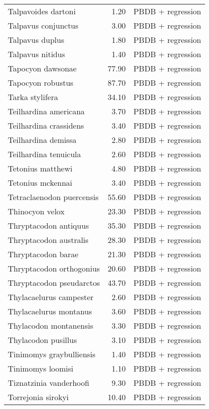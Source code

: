 \begin{table}[ht]
\begin{tabular}{lrl}
  Talpavoides dartoni & 1.20 & PBDB + regression \\ 
  Talpavus conjunctus & 3.00 & PBDB + regression \\ 
  Talpavus duplus & 1.80 & PBDB + regression \\ 
  Talpavus nitidus & 1.40 & PBDB + regression \\ 
  Tapocyon dawsonae & 77.90 & PBDB + regression \\ 
  Tapocyon robustus & 87.70 & PBDB + regression \\ 
  Tarka stylifera & 34.10 & PBDB + regression \\ 
  Teilhardina americana & 3.70 & PBDB + regression \\ 
  Teilhardina crassidens & 3.40 & PBDB + regression \\ 
  Teilhardina demissa & 2.80 & PBDB + regression \\ 
  Teilhardina tenuicula & 2.60 & PBDB + regression \\ 
  Tetonius matthewi & 4.80 & PBDB + regression \\ 
  Tetonius mckennai & 3.40 & PBDB + regression \\ 
  Tetraclaenodon puercensis & 55.60 & PBDB + regression \\ 
  Thinocyon velox & 23.30 & PBDB + regression \\ 
  Thryptacodon antiquus & 35.30 & PBDB + regression \\ 
  Thryptacodon australis & 28.30 & PBDB + regression \\ 
  Thryptacodon barae & 21.30 & PBDB + regression \\ 
  Thryptacodon orthogonius & 20.60 & PBDB + regression \\ 
  Thryptacodon pseudarctos & 43.70 & PBDB + regression \\ 
  Thylacaelurus campester & 2.60 & PBDB + regression \\ 
  Thylacaelurus montanus & 3.60 & PBDB + regression \\ 
  Thylacodon montanensis & 3.30 & PBDB + regression \\ 
  Thylacodon pusillus & 3.10 & PBDB + regression \\ 
  Tinimomys graybulliensis & 1.40 & PBDB + regression \\ 
  Tinimomys loomisi & 1.10 & PBDB + regression \\ 
  Tiznatzinia vanderhoofi & 9.30 & PBDB + regression \\ 
  Torrejonia sirokyi & 10.40 & PBDB + regression \\ 

\end{tabular}
\end{table}
